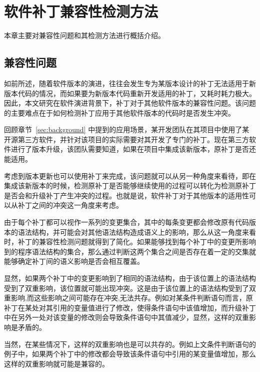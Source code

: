 \chapter{软件补丁兼容性检测方法}

本章主要对兼容性问题和其检测方法进行概括介绍。

\section{兼容性问题}
\label {sec_problem}
如前所述，随着软件版本的演进，往往会发生专为某版本设计的补丁无法适用于新版本代码的情况，而如果要为新版本代码重新开发适用的补丁，又耗时耗力极大。因此，本文研究在软件演进背景下，补丁对于其他软件版本的兼容性问题。该问题的主要难点在于如何检测补丁应用于其他软件版本的代码时是否发生冲突。

回顾章节~\ref{sec:background} 中提到的应用场景，某开发团队在其项目中使用了某开源第三方软件，并针对该项目的实际需要对其开发了专门的补丁。现在第三方软件进行了版本升级，该团队需要知道，如果在项目中集成该新版本，原补丁是否还能适用。

考虑到版本更新也可以使用补丁来完成，该问题就可以从另一种角度来看待，即在集成该新版本的时候，检测原补丁是否能够继续使用的过程可以转化为检测原补丁是否会和升级补丁产生冲突的过程。也就是说，软件补丁对于其他版本的适用性可以从补丁之间的冲突这一角度来考虑。

由于每个补丁都可以视作一系列的变更集合，其中的每条变更都会修改原有代码版本的语法结构，并可能会对其他语法结构造成语义上的影响，那么从这一角度来看时，补丁的兼容性检测问题就得到了简化。如果能够找到每个补丁中的变更所影响到的程序语法结构的集合，那么通过判断这两个集合之间是否存在着一定的交集就能够确定补丁间的语义影响是否会相互覆盖。

显然，如果两个补丁中的变更影响到了相同的语法结构，由于该位置上的语法结构受到了双重影响，该位置就可能出现冲突。这是由于该位置上的语法结构受到了双重影响,而这些影响之间可能存在冲突,无法共存。例如对某条件判断语句而言，原补丁在某处对其引用的变量值进行了修改，使得条件语句中该值增加，而升级补丁中在另外一处对该变量的修改则会导致条件语句中其值减少，显然，这样的双重影响是矛盾的。

当然，在某些情况下，这样的双重影响也是可以共存的。例如上文条件判断语句的例子中，如果两个补丁中的修改都会导致该条件语句中引用的某变量值增加，那么这样的双重影响就可能是兼容的。


